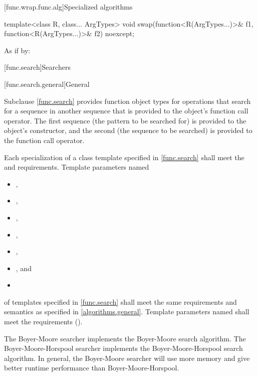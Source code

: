 [func.wrap.func.alg]{Specialized algorithms}

%
\begin{itemdecl}
template<class R, class... ArgTypes>
  void swap(function<R(ArgTypes...)>& f1, function<R(ArgTypes...)>& f2) noexcept;
\end{itemdecl}

\begin{itemdescr}
\pnum
\effects
As if by: 
\end{itemdescr}%

[func.search]{Searchers}

[func.search.general]{General}

\pnum
Subclause \ref{func.search} provides function object types for
operations that search for a sequence  in another
sequence  that is provided to the object's function call
operator.  The first sequence (the pattern to be searched for) is provided to
the object's constructor, and the second (the sequence to be searched) is
provided to the function call operator.

\pnum
Each specialization of a class template specified in \ref{func.search}
shall meet the  and  requirements.
Template parameters named
\begin{itemize}
\item {},
\item {},
\item {},
\item {},
\item {},
\item {}, and
\item {}
\end{itemize}
of templates specified in
\ref{func.search} shall meet the same requirements and semantics as
specified in \ref{algorithms.general}.
Template parameters named  shall meet the 
requirements ().

\pnum
The Boyer-Moore searcher implements the Boyer-Moore search algorithm.
The Boyer-Moore-Horspool searcher implements the Boyer-Moore-Horspool search algorithm.
In general, the Boyer-Moore searcher will use more memory and give better runtime performance than Boyer-Moore-Horspool.

